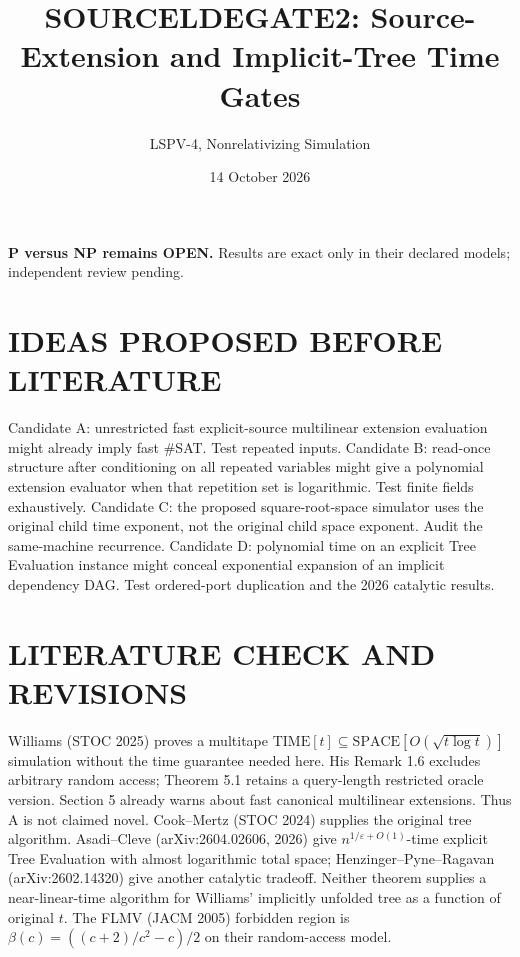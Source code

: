 \documentclass[11pt]{article}
\title{SOURCELDEGATE2: Source-Extension and Implicit-Tree Time Gates}
\author{LSPV-4, Nonrelativizing Simulation}
\date{14 October 2026}
\begin{document}
\maketitle
\noindent\textbf{P versus NP remains OPEN.} Results are exact only in
their declared models; independent review pending.
\section{IDEAS PROPOSED BEFORE LITERATURE}
Candidate A: unrestricted fast explicit-source multilinear extension
evaluation might already imply fast \#SAT. Test repeated inputs.
Candidate B: read-once structure after conditioning on all repeated
variables might give a polynomial extension evaluator when that
repetition set is logarithmic. Test finite fields exhaustively.
Candidate C: the proposed square-root-space simulator uses the
original child time exponent, not the original child space exponent.
Audit the same-machine recurrence.
Candidate D: polynomial time on an explicit Tree Evaluation instance
might conceal exponential expansion of an implicit dependency DAG.
Test ordered-port duplication and the 2026 catalytic results.
\section{LITERATURE CHECK AND REVISIONS}
Williams (STOC 2025) proves a multitape
$\mathrm{TIME}[t]\subseteq\mathrm{SPACE}[O(\sqrt{t\log t})]$
simulation without the time guarantee needed here. His Remark 1.6
excludes arbitrary random access; Theorem 5.1 retains a query-length
restricted oracle version. Section 5 already warns about fast
canonical multilinear extensions. Thus A is not claimed novel.
Cook--Mertz (STOC 2024) supplies the original tree algorithm.
Asadi--Cleve (arXiv:2604.02606, 2026) give
$n^{1/\varepsilon+O(1)}$-time explicit Tree Evaluation with almost
logarithmic total space; Henzinger--Pyne--Ragavan
(arXiv:2602.14320) give another catalytic tradeoff.
Neither theorem supplies a near-linear-time algorithm for Williams'
implicitly unfolded tree as a function of original $t$.
The FLMV (JACM 2005) forbidden region is
$\beta(c)=((c+2)/c^2-c)/2$ on their random-access model.
\end{document}
